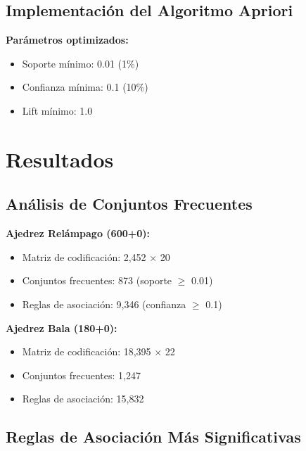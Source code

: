 \documentclass[11pt,a4paper]{article}
\begin{document}
\subsection{Implementaci\'on del Algoritmo Apriori}

\textbf{Par\'ametros optimizados:}
\begin{itemize}
\item Soporte m\'inimo: 0.01 (1\%)
\item Confianza m\'inima: 0.1 (10\%)
\item Lift m\'inimo: 1.0
\end{itemize}

\section{Resultados}

\subsection{An\'alisis de Conjuntos Frecuentes}

\textbf{Ajedrez Rel\'ampago (600+0):}
\begin{itemize}
\item Matriz de codificaci\'on: 2,452 $\times$ 20
\item Conjuntos frecuentes: 873 (soporte $\geq$ 0.01)
\item Reglas de asociaci\'on: 9,346 (confianza $\geq$ 0.1)
\end{itemize}

\textbf{Ajedrez Bala (180+0):}
\begin{itemize}
\item Matriz de codificaci\'on: 18,395 $\times$ 22
\item Conjuntos frecuentes: 1,247
\item Reglas de asociaci\'on: 15,832
\end{itemize}

\subsection{Reglas de Asociaci\'on M\'as Significativas}
\end{document}
